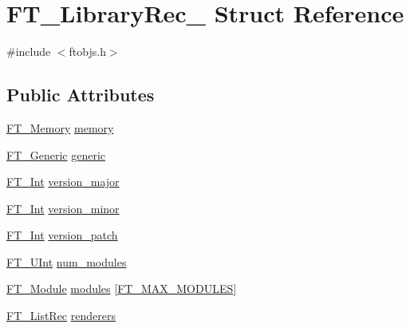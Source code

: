\hypertarget{struct_f_t___library_rec__}{\section{F\-T\-\_\-\-Library\-Rec\-\_\- Struct Reference}
\label{struct_f_t___library_rec__}
}


{\ttfamily \#include $<$ftobjs.\-h$>$}

\subsection*{Public Attributes}
\begin{DoxyCompactItemize}
\item 
\hyperlink{ftsystem_8h_a67ec7ea35cde99a89a65e9f827a9ad3a}{F\-T\-\_\-\-Memory} \hyperlink{struct_f_t___library_rec___afe392b83bc018b1b1fb25459f68a5861}{memory}
\item 
\hyperlink{fttypes_8h_ae15e8550dd7d863328686aadaead5c77}{F\-T\-\_\-\-Generic} \hyperlink{struct_f_t___library_rec___a68920b41043e7935fa695d53f246c992}{generic}
\item 
\hyperlink{fttypes_8h_af90e5fb0d07e21be9fe6faa33f02484c}{F\-T\-\_\-\-Int} \hyperlink{struct_f_t___library_rec___a218c30755bac8b58592d70148c938e38}{version\-\_\-major}
\item 
\hyperlink{fttypes_8h_af90e5fb0d07e21be9fe6faa33f02484c}{F\-T\-\_\-\-Int} \hyperlink{struct_f_t___library_rec___a211d591fbc89d9471715638809865290}{version\-\_\-minor}
\item 
\hyperlink{fttypes_8h_af90e5fb0d07e21be9fe6faa33f02484c}{F\-T\-\_\-\-Int} \hyperlink{struct_f_t___library_rec___a51ab560542e78c5e65e248b5a94f66a1}{version\-\_\-patch}
\item 
\hyperlink{fttypes_8h_abcb8db4dbf35d2b55a9e8c7b0926dc52}{F\-T\-\_\-\-U\-Int} \hyperlink{struct_f_t___library_rec___af75d01983c4d91bb3373583424750afa}{num\-\_\-modules}
\item 
\hyperlink{freetype_8h_a660c1bb333747abacdc433b7d73ca59b}{F\-T\-\_\-\-Module} \hyperlink{struct_f_t___library_rec___af66a4d9e9fbcaa2ff0e18a9cc8d3d89d}{modules} \mbox{[}\hyperlink{ftoption_8h_a2fa51a675b9b4bf8117b76f57f415592}{F\-T\-\_\-\-M\-A\-X\-\_\-\-M\-O\-D\-U\-L\-E\-S}\mbox{]}
\item 
\hyperlink{fttypes_8h_ac01ed10278dab3cb3f046dba687b50ed}{F\-T\-\_\-\-List\-Rec} \hyperlink{struct_f_t___library_rec___ad9503f71cf4e4d88edfbdda59eb5e43d}{renderers}
\item 

\end{DoxyCompactItemize}
